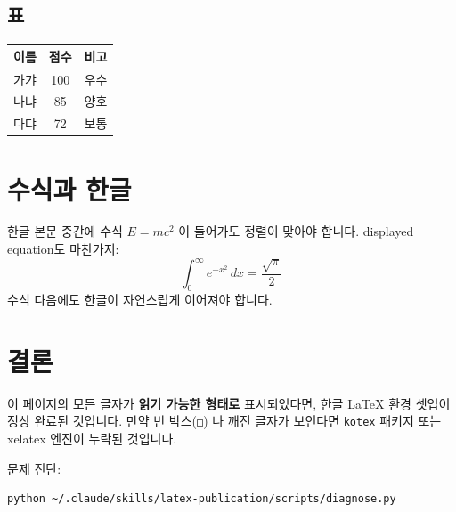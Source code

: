 \documentclass[11pt]{article}
\begin{document}
\subsection{표}
\begin{tabular}{|l|c|r|}
\hline
이름 & 점수 & 비고 \\
\hline
가갸 & 100 & 우수 \\
나냐 & 85  & 양호 \\
다댜 & 72  & 보통 \\
\hline
\end{tabular}

\section{수식과 한글}
한글 본문 중간에 수식 $E = mc^2$ 이 들어가도 정렬이 맞아야 합니다.
displayed equation도 마찬가지:
\[
  \int_0^\infty e^{-x^2}\,dx = \frac{\sqrt{\pi}}{2}
\]
수식 다음에도 한글이 자연스럽게 이어져야 합니다.

\section{결론}
이 페이지의 모든 글자가 \textbf{읽기 가능한 형태로} 표시되었다면, 한글 LaTeX
환경 셋업이 정상 완료된 것입니다. 만약 빈 박스(\texttt{□}) 나 깨진 글자가
보인다면 \texttt{kotex} 패키지 또는 xelatex 엔진이 누락된 것입니다.

문제 진단:
\begin{verbatim}
python ~/.claude/skills/latex-publication/scripts/diagnose.py
\end{verbatim}
\end{document}
